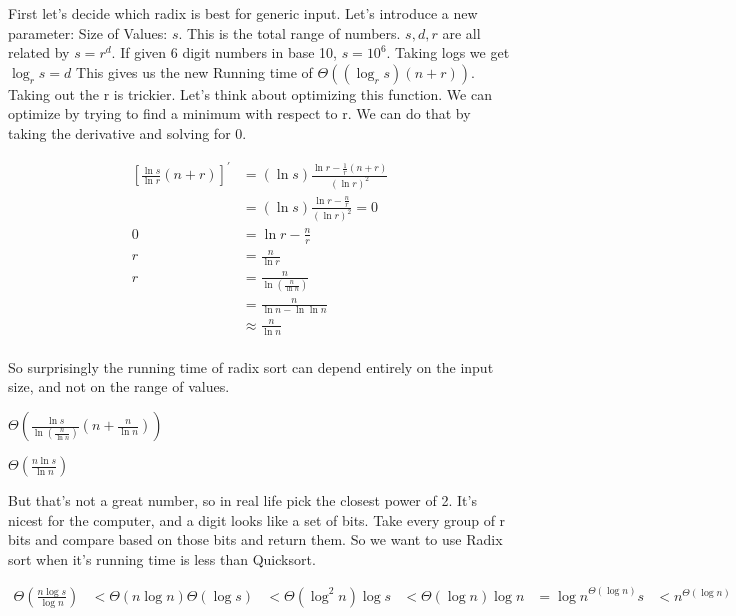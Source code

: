 \documentclass[english, 10pt]{article}
\begin{document}
First let's decide which radix is best for generic input. Let's introduce a new
parameter: Size of Values: $s$. This is the total range of numbers. $s,d,r$ are
all related by $s=r^d$. If given 6 digit numbers in base 10, $s=10^6$. Taking
logs we get $\log_r s = d$ This gives us the new Running time of $\Theta(
(\log_r s)(n+r))$. Taking out the r is trickier. Let's think about optimizing
this function. We can optimize by trying to find a minimum with respect to r.
We can do that by taking the derivative and solving for 0.

\begin{align*}
    {\left[\frac{\ln s}{\ln r}(n+r) \right]}^{\prime} & = (\ln s) \frac{\ln r - \frac{1}{r}(n+r)}{{(\ln r)}^2} \\
                                                      & = (\ln s) \frac{\ln r -\frac{n}{r}}{{(\ln r)}^2} = 0 \\
    0                                                 & = \ln r - \frac{n}{r}  \\
    r                                                 & = \frac{n}{\ln r}  \\
    r                                                 & = \frac{n}{\ln ( \frac{n}{\ln n}) } \\
                                                      & = \frac{n}{\ln n - \ln\ln n} \\
                                                      & \approx \frac{n}{\ln n} \\
\end{align*}

So surprisingly the running time of radix sort can depend entirely on the input size, and not on the range of values.

$\Theta(\frac{\ln s}{\ln(\frac{n}{\ln n})}(n+\frac{n}{\ln n}))$

$\Theta(\frac{n \ln s}{\ln n} )$

But that's not a great number, so in real life pick the closest power of 2.
It's nicest for the computer, and a digit looks like a set of bits. Take every
group of r bits and compare based on those bits and return them. So we want to
use Radix sort when it's running time is less than Quicksort.

\begin{align*}
\Theta\left( \frac{n\log s}{\log n } \right) &< \Theta\left( n \log n \right)
\Theta\left( \log s \right) &< \Theta\left( \log^2 n \right)
\log s &< \Theta\left( \log n \right)\log n
&={\log n}^{\Theta(\log n)}
s&<n^{\Theta\left( \log n \right)}
\end{align*}
\end{document}
